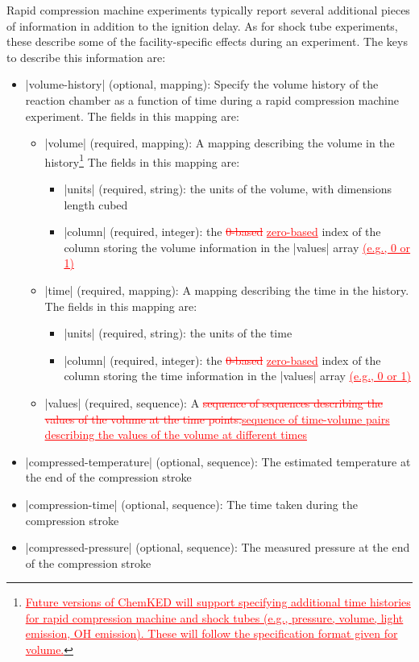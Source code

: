 \documentclass[12pt]{ijck}
\newcommand\ck{ChemKED}
\newcommand{\addtwo}[1]{{\sloppy\textcolor{red}{\uline{#1}}}}  %
\newcommand{\deletetwo}[1]{\sloppy\textcolor{red}{\sout{#1}}}    %
\begin{document}
Rapid compression machine experiments typically report several additional pieces of information in
addition to the ignition delay. As for shock tube experiments, these describe some of the
facility-specific effects during an experiment. The keys to describe this information are:
%
\begin{itemize}
    \item \yabox|volume-history| (optional, mapping): Specify the volume history of the reaction
    chamber as a function of time during a rapid compression machine experiment. The fields in this
    mapping are:
    \begin{itemize}
        \item \yabox|volume| (required, mapping): A mapping describing the volume in the history\footnote{\addtwo{Future versions
        of \ck{} will support specifying additional time histories for rapid compression machine and shock tubes (e.g.,
        pressure, volume, light emission, OH emission). These will follow the specification format given for volume.}}
        The fields in this mapping are:
        \begin{itemize}
            \item \yabox|units| (required, string): the units of the volume, with dimensions length
            cubed
            \item \yabox|column| (required, integer): the \deletetwo{0-based} \addtwo{zero-based} index of the column storing the
            volume information in the \yabox|values| array \addtwo{(e.g., 0 or 1)}
        \end{itemize}
        \item \yabox|time| (required, mapping): A mapping describing the time in the history.
        The fields in this mapping are:
        \begin{itemize}
            \item \yabox|units| (required, string): the units of the time
            \item \yabox|column| (required, integer): the \deletetwo{0-based} \addtwo{zero-based} index of the column storing the
            time information in the \yabox|values| array \addtwo{(e.g., 0 or 1)}
        \end{itemize}
        \item \yabox|values| (required, sequence): A \deletetwo{sequence of sequences describing the values of
        the volume at the time points.}\addtwo{sequence of time-volume pairs describing the values
        of the volume at different times}
    \end{itemize}
    \item \yabox|compressed-temperature| (optional, sequence): The estimated temperature at the end
    of the compression stroke
    \item \yabox|compression-time| (optional, sequence): The time taken during the compression
    stroke
    \item \yabox|compressed-pressure| (optional, sequence): The measured pressure at the end of the
    compression stroke
\end{itemize}
\end{document}
